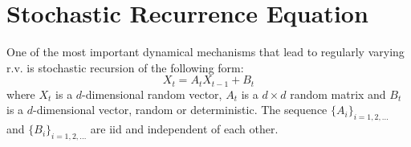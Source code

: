 
\section{Stochastic Recurrence Equation}
One of the most important dynamical mechanisms that lead to regularly
varying r.v. is stochastic recursion of the following form:
\begin{equation}
  \label{eq:rhjyu}
  X_t = A_t X_{t-1} + B_t
\end{equation}
where $X_t$ is a $d$-dimensional random vector, $A_t$ is a $d\times d$
random matrix and $B_t$ is a $d$-dimensional vector, random or
deterministic. The sequence $\{A_i\}_{i=1,2,\dots}$ and
$\{B_i\}_{i=1,2,\dots}$  are iid and independent of each other.

